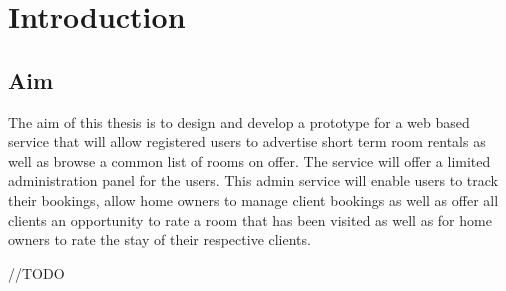 \chapter*{Introduction}

\section*{Aim}
The aim of this thesis is to design and develop a prototype for a web based service that will allow registered users to advertise short term room rentals as well as browse a common list of rooms on offer. The service will offer a limited administration panel for the users. This admin service will enable users to track their bookings, allow home owners to manage client bookings as well as offer all clients an opportunity to rate a room that has been visited as well as for home owners to rate the stay of their respective clients. 

//TODO
